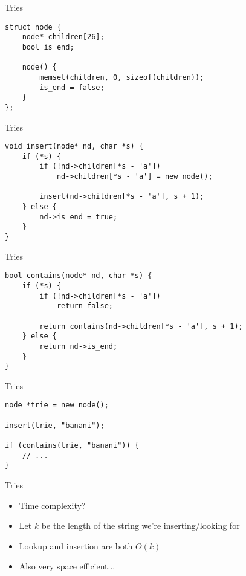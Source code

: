 \documentclass[12pt,t]{beamer}
\newcommand{\bi}{\begin{itemize}}
\newcommand{\ei}{\end{itemize}}
\begin{document}
\begin{frame}[fragile]{Tries}
    \begin{verbatim}
struct node {
    node* children[26];
    bool is_end;

    node() {
        memset(children, 0, sizeof(children));
        is_end = false;
    }
};
    \end{verbatim}
\end{frame}

\begin{frame}[fragile]{Tries}
    \begin{verbatim}
void insert(node* nd, char *s) {
    if (*s) {
        if (!nd->children[*s - 'a'])
            nd->children[*s - 'a'] = new node();

        insert(nd->children[*s - 'a'], s + 1);
    } else {
        nd->is_end = true;
    }
}
    \end{verbatim}
\end{frame}

\begin{frame}[fragile]{Tries}
    \begin{verbatim}
bool contains(node* nd, char *s) {
    if (*s) {
        if (!nd->children[*s - 'a'])
            return false;

        return contains(nd->children[*s - 'a'], s + 1);
    } else {
        return nd->is_end;
    }
}
    \end{verbatim}
\end{frame}

\begin{frame}[fragile]{Tries}
    \begin{verbatim}
node *trie = new node();

insert(trie, "banani");

if (contains(trie, "banani")) {
    // ...
}
    \end{verbatim}
\end{frame}

\begin{frame}{Tries}
    \vspace{30pt}
    \bi
        \item Time complexity?
        \vspace{10pt}
        \item Let $k$ be the length of the string we're inserting/looking for
        \item Lookup and insertion are both $O(k)$
        \vspace{10pt}
        \item Also very space efficient...
    \ei
\end{frame}
\end{document}
